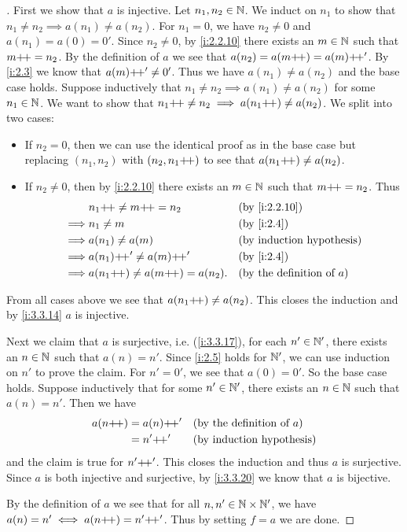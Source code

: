 \begin{proof}[]
  First we show that \(a\) is injective.
  Let \(n_1, n_2 \in \mathbb{N}\).
  We induct on \(n_1\) to show that \(n_1 \neq n_2 \implies a(n_1) \neq a(n_2)\).
  For \(n_1 = 0\), we have \(n_2 \neq 0\) and \(a(n_1) = a(0) = 0'\).
  Since \(n_2 \neq 0\), by \cref{i:2.2.10} there exists an \(m \in \mathbb{N}\) such that \(m{+}\!{+} = n_2\).
  By the definition of \(a\) we see that \(a(n_2) = a(m{+}\!{+}) = a(m){+}\!{+}'\).
  By \cref{i:2.3} we know that \(a(m){+}\!{+}' \neq 0'\).
  Thus we have \(a(n_1) \neq a(n_2)\) and the base case holds.
  Suppose inductively that \(n_1 \neq n_2 \implies a(n_1) \neq a(n_2)\) for some \(n_1 \in \mathbb{N}\).
  We want to show that \(n_1{+}\!{+} \neq n_2 \implies a(n_1{+}\!{+}) \neq a(n_2)\).
  We split into two cases:
  \begin{itemize}
    \item If \(n_2 = 0\), then we can use the identical proof as in the base case but replacing \((n_1, n_2)\) with \((n_2, n_1{+}\!{+})\) to see that \(a(n_1{+}\!{+}) \neq a(n_2)\).
    \item If \(n_2 \neq 0\), then by \cref{i:2.2.10} there exists an \(m \in \mathbb{N}\) such that \(m{+}\!{+} = n_2\).
          Thus
          \begin{align*}
                     & n_1\pp \neq m\pp = n_2           &  & \by{i:2.2.10}                       \\
            \implies & n_1 \neq m                       &  & \by{i:2.4}                          \\
            \implies & a(n_1) \neq a(m)                 &  & \byIH                               \\
            \implies & a(n_1)\pp' \neq a(m)\pp'         &  & \by{i:2.4}                          \\
            \implies & a(n_1\pp) \neq a(m\pp) = a(n_2). &  & \text{(by the definition of \(a\))}
          \end{align*}
  \end{itemize}
  From all cases above we see that \(a(n_1{+}\!{+}) \neq a(n_2)\).
  This closes the induction and by \cref{i:3.3.14} \(a\) is injective.

  Next we claim that \(a\) is surjective, i.e. (\cref{i:3.3.17}), for each \(n' \in \mathbb{N}'\), there exists an \(n \in \mathbb{N}\) such that \(a(n) = n'\).
  Since \cref{i:2.5} holds for \(\mathbb{N}'\), we can use induction on \(n'\) to prove the claim.
  For \(n' = 0'\), we see that \(a(0) = 0'\).
  So the base case holds.
  Suppose inductively that for some \(n' \in \mathbb{N}'\), there exists an \(n \in \mathbb{N}\) such that \(a(n) = n'\).
  Then we have
  \begin{align*}
    a(n{+}\!{+}) & = a(n){+}\!{+}' &  & \text{(by the definition of \(a\))} \\
            & = n'{+}\!{+}'   &  & \text{(by induction hypothesis)}
  \end{align*}
  and the claim is true for \(n'{+}\!{+}'\).
  This closes the induction and thus \(a\) is surjective.
  Since \(a\) is both injective and surjective, by \cref{i:3.3.20} we know that \(a\) is bijective.

  By the definition of \(a\) we see that for all \(n, n' \in \mathbb{N} \times \mathbb{N}'\), we have \(a(n) = n' \iff a(n{+}\!{+}) = n'{+}\!{+}'\).
  Thus by setting \(f = a\) we are done.
\end{proof}
